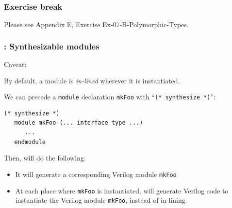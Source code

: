 \begin{frame}
\frametitle{\EmojiExercise \hmm Exercise break}

Please see Appendix E, Exercise Ex-07-B-Polymorphic-Types.

\end{frame}


\begin{frame}[fragile]
\frametitle{{\BSV}: Synthesizable modules}

\footnotesize

Caveat:

\vspace{5ex}

By default, a {\BSV} module is \emph{in-lined} wherever it is instantiated.

\vspace{1ex}

We can precede a {\tt module} declaration {\tt mkFoo} with ``{\tt (*
synthesize *)}'':

\begin{Verbatim}[frame=single]
   (* synthesize *)
   module mkFoo (... interface type ...)
      ...
   endmodule
\end{Verbatim}

Then, {\bsc} will do the following:
\begin{itemize}
 \item It will generate a corresponding  Verilog module {\tt mkFoo}

 \item At each place where {\tt mkFoo} is instantiated, {\bsc} will
       generate Verilog code to instantiate the Verilog module {\tt mkFoo},
       instead of in-lining.
\end{itemize}

\end{frame}


